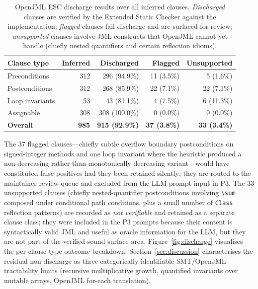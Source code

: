 \begin{table}[ht]
\centering
\caption{OpenJML ESC discharge results over all inferred clauses. \emph{Discharged} clauses are verified by the Extended Static Checker against the implementation; \emph{flagged} clauses fail discharge and are surfaced for review; \emph{unsupported} clauses involve JML constructs that OpenJML cannot yet handle (chiefly nested quantifiers and certain reflection idioms).}
\label{tab:discharge}
\begin{tabular}{lrrrr}
\toprule
\textbf{Clause type} & \textbf{Inferred} & \textbf{Discharged} & \textbf{Flagged} & \textbf{Unsupported} \\
\midrule
Preconditions     & 312 & 296 (94.9\%) & 11 (3.5\%) &  5 (1.6\%) \\
Postconditions    & 312 & 268 (85.9\%) & 22 (7.1\%) & 22 (7.1\%) \\
Loop invariants   &  53 &  43 (81.1\%) &  4 (7.5\%) &  6 (11.3\%) \\
Assignable        & 308 & 308 (100.0\%) &  0 (0.0\%) &  0 (0.0\%) \\
\midrule
\textbf{Overall}  & \textbf{985} & \textbf{915 (92.9\%)} & \textbf{37 (3.8\%)} & \textbf{33 (3.4\%)} \\
\bottomrule
\end{tabular}
\end{table}

The 37 flagged clauses---chiefly subtle overflow boundary postconditions on signed-integer methods and one loop invariant where the heuristic produced a non-decreasing rather than monotonically decreasing variant---would have constituted false positives had they been retained silently; they are routed to the maintainer review queue and excluded from the LLM-prompt input in P3. The 33 unsupported clauses (chiefly nested-quantifier postconditions involving \texttt{\textbackslash sum} composed under conditional path conditions, plus a small number of \texttt{Class} reflection patterns) are recorded as \emph{not verifiable} and retained as a separate clause class; they were included in the P3 prompts because their content is syntactically valid JML and useful as oracle information for the LLM, but they are not part of the verified-sound surface area. Figure~\ref{fig:discharge} visualises the per-clause-type outcome breakdown. Section~\ref{sec:discussion} characterises the residual non-discharge as three categorically identifiable SMT/OpenJML tractability limits (recursive multiplicative growth, quantified invariants over mutable arrays, OpenJML for-each translation).

